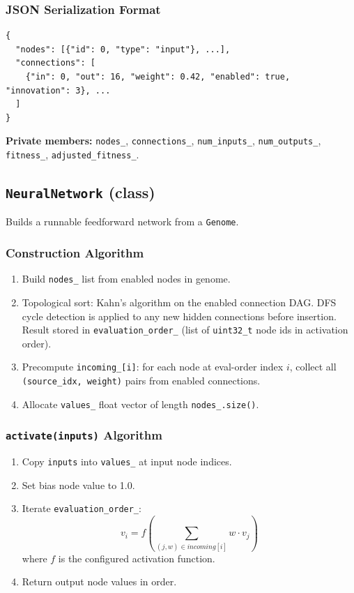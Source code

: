 \subsubsection{JSON Serialization Format}

\begin{lstlisting}[language={},caption={Genome JSON schema}]
{
  "nodes": [{"id": 0, "type": "input"}, ...],
  "connections": [
    {"in": 0, "out": 16, "weight": 0.42, "enabled": true, "innovation": 3}, ...
  ]
}
\end{lstlisting}

\textbf{Private members:} \texttt{nodes\_}, \texttt{connections\_},
\texttt{num\_inputs\_}, \texttt{num\_outputs\_}, \texttt{fitness\_},
\texttt{adjusted\_fitness\_}.

\subsection{\texttt{NeuralNetwork} (class)}

Builds a runnable feedforward network from a \texttt{Genome}.

\subsubsection{Construction Algorithm}
\begin{enumerate}[nosep]
  \item Build \texttt{nodes\_} list from enabled nodes in genome.
  \item Topological sort: Kahn's algorithm on the enabled connection DAG.  DFS cycle
    detection is applied to any new hidden connections before insertion.  Result stored
    in \texttt{evaluation\_order\_} (list of \texttt{uint32\_t} node ids in activation
    order).
  \item Precompute \texttt{incoming\_[i]}: for each node at eval-order index $i$,
    collect all \texttt{(source\_idx, weight)} pairs from enabled connections.
  \item Allocate \texttt{values\_} float vector of length \texttt{nodes\_.size()}.
\end{enumerate}

\subsubsection{\texttt{activate(inputs)} Algorithm}
\begin{enumerate}[nosep]
  \item Copy \texttt{inputs} into \texttt{values\_} at input node indices.
  \item Set bias node value to 1.0.
  \item Iterate \texttt{evaluation\_order\_}:
    \[
      v_i = f\!\left(\sum_{(j,w) \in \mathit{incoming}[i]} w \cdot v_j\right)
    \]
    where $f$ is the configured activation function.
  \item Return output node values in order.
\end{enumerate}

